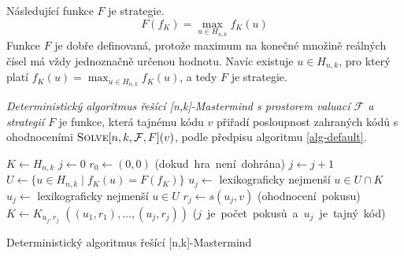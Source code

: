 
\begin{prikl}\label{prstrategie}
    Následující funkce $F$ je strategie.
    \[F(f_K) =  \max_{u\in H_{n,k}} f_K(u)\]
    Funkce $F$ je dobře definovaná, protože maximum na konečné množině reálných čísel má vždy jednoznačně určenou hodnotu. Navíc existuje $u\in H_{n,k}$, pro který platí $f_K(u) = \max_{u\in H_{n,k}} f_K(u)$, a tedy $F$ je strategie.
\end{prikl}



\begin{definice}\label{defobecnyalg}
    \emph{Deterministický algoritmus řešící [n,k]-Mastermind s prostorem valuací $\mathcal{F}$ a strategií $F$} je funkce, která tajnému kódu $v$ přiřadí posloupnost zahraných kódů s ohodnoceními $\textsc{Solve}[n, k, \mathcal{F}, F](v)$, podle předpisu algoritmu \ref{alg-default}.
    
    
    
\end{definice}
\begin{algorithm}[h!]
\begin{algorithmic}[1]  %
    \State $K \gets H_{n,k}$ 
    \State $j \gets 0$
    \State $r_0 \gets (0,0)$
     \hfill \mbox{(dokud hra není dohrána)}
        \State $j \gets j + 1$ 
	\State $U \gets \{u \in H_{n,k} \mid f_K(u) = F(f_K)\}$
            \State $u_j \gets$ lexikograficky nejmenší $u \in U \cap K$
	\Else
		\State $u_j \gets$ lexikograficky nejmenší $u \in U$
	\EndIf
        \State $r_j \gets s(u_j, v)$ \hfill \mbox{(ohodnocení pokusu)}
        \State $K \gets K_{u_j,r_j}$
    \EndWhile
    \State \Return $((u_1,r_1),\dots,(u_j, r_j))$ \hfill \mbox{($j$ je počet pokusů a $u_j$ je tajný kód)}
\EndFunction
\end{algorithmic}
\caption{Deterministický algoritmus řešící [n,k]-Mastermind}
\label{alg-default}
\end{algorithm}

